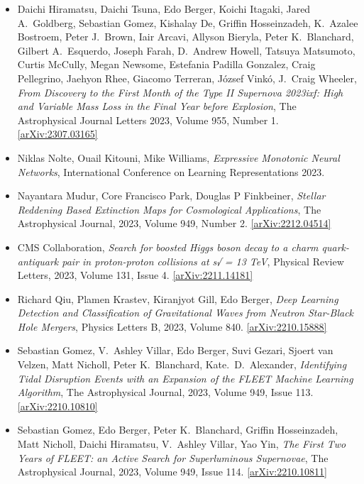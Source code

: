 \begin{itemize}
\item Daichi Hiramatsu, Daichi Tsuna, Edo Berger, Koichi Itagaki, Jared A.\  Goldberg, Sebastian Gomez, Kishalay De, Griffin Hosseinzadeh, K.\  Azalee Bostroem, Peter J.\  Brown, Iair Arcavi, Allyson Bieryla, Peter K.\  Blanchard, Gilbert A.\  Esquerdo, Joseph Farah, D.\  Andrew Howell, Tatsuya Matsumoto, Curtis McCully, Megan Newsome, Estefania Padilla Gonzalez, Craig Pellegrino, Jaehyon Rhee, Giacomo Terreran, József Vinkó, J.\  Craig Wheeler, \textit{From Discovery to the First Month of the Type II Supernova 2023ixf: High and Variable Mass Loss in the Final Year before Explosion}, The Astrophysical Journal Letters 2023, Volume 955, Number 1. \href{https://arxiv.org/abs/2307.03165}{[arXiv:2307.03165]} 
\item Niklas Nolte, Ouail Kitouni, Mike Williams, \textit{Expressive Monotonic Neural Networks}, International Conference on Learning Representations 2023. 
\item Nayantara Mudur, Core Francisco Park, Douglas P Finkbeiner, \textit{Stellar Reddening Based Extinction Maps for Cosmological Applications}, The Astrophysical Journal, 2023, Volume 949, Number 2. \href{https://arxiv.org/abs/2212.04514}{[arXiv:2212.04514]} 
\item CMS Collaboration, \textit{Search for boosted Higgs boson decay to a charm quark-antiquark pair in proton-proton collisions at s√ = 13 TeV}, Physical Review Letters, 2023, Volume 131, Issue 4. \href{https://arxiv.org/abs/2211.14181}{[arXiv:2211.14181]} 
\item Richard Qiu, Plamen Krastev, Kiranjyot Gill, Edo Berger, \textit{Deep Learning Detection and Classification of Gravitational Waves from Neutron Star-Black Hole Mergers}, Physics Letters B, 2023, Volume 840. \href{https://arxiv.org/abs/2210.15888}{[arXiv:2210.15888]} 
\item Sebastian Gomez, V.\  Ashley Villar, Edo Berger, Suvi Gezari, Sjoert van Velzen, Matt Nicholl, Peter K.\  Blanchard, Kate.\  D.\  Alexander, \textit{Identifying Tidal Disruption Events with an Expansion of the FLEET Machine Learning Algorithm}, The Astrophysical Journal, 2023, Volume 949, Issue 113. \href{https://arxiv.org/abs/2210.10810}{[arXiv:2210.10810]} 
\item Sebastian Gomez, Edo Berger, Peter K.\  Blanchard, Griffin Hosseinzadeh, Matt Nicholl, Daichi Hiramatsu, V.\  Ashley Villar, Yao Yin, \textit{The First Two Years of FLEET: an Active Search for Superluminous Supernovae}, The Astrophysical Journal, 2023, Volume 949, Issue 114. \href{https://arxiv.org/abs/2210.10811}{[arXiv:2210.10811]} 

\end{itemize}
